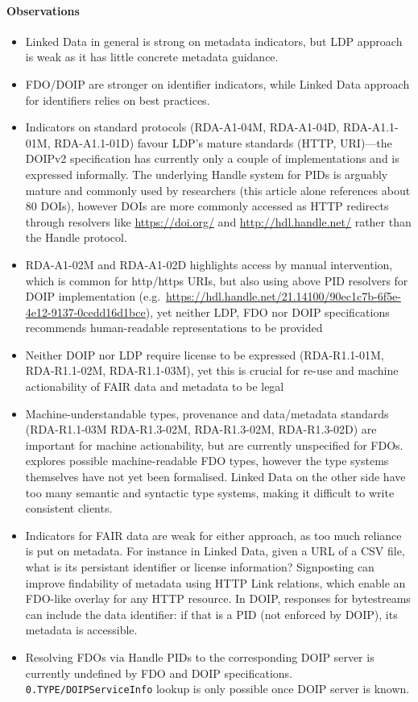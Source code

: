 \paragraph{Observations}

\begin{itemize}
\item
  Linked Data in general is strong on metadata indicators, but LDP approach is weak as it has little concrete metadata guidance.
\item
  FDO/DOIP are stronger on identifier indicators, while Linked Data approach for identifiers relies on best practices. 
\item
  Indicators on standard protocols (RDA-A1-04M, RDA-A1-04D, RDA-A1.1-01M, RDA-A1.1-01D) favour LDP's mature standards (HTTP, URI)---the DOIPv2 specification \cite{DONA 2018} has currently only a couple of implementations and is expressed informally. The underlying Handle system for PIDs is arguably mature and commonly used by researchers (this article alone references about 80 DOIs), however DOIs are more commonly accessed as HTTP redirects through resolvers like \url{https://doi.org/} and \url{http://hdl.handle.net/} rather than the Handle protocol.
\item
  RDA-A1-02M and RDA-A1-02D highlights access by manual intervention, which is common for http/https URIs, but also using above PID resolvers for DOIP implementation  (e.g.~\url{https://hdl.handle.net/21.14100/90ec1c7b-6f5e-4e12-9137-0cedd16d1bce}), yet neither LDP, FDO nor DOIP specifications recommends human-readable representations to be provided
\item
  Neither DOIP nor LDP require license to be expressed (RDA-R1.1-01M, RDA-R1.1-02M, RDA-R1.1-03M), yet this is crucial for re-use and machine actionability of FAIR data and metadata to be legal
\item
  Machine-understandable types, provenance and data/metadata standards (RDA-R1.1-03M RDA-R1.3-02M, RDA-R1.3-02M, RDA-R1.3-02D) are important for machine actionability, but are currently unspecified for FDOs. \cite{Blanchi 2023} explores possible machine-readable FDO types, however the type systems themselves have not yet been formalised. Linked Data on the other side have too many semantic and syntactic type systems, making it difficult to write consistent clients.
\item
  Indicators for FAIR data are weak for either approach, as too much reliance is put on metadata. For instance in Linked Data, given a URL of a CSV file, what is its persistant identifier or license information? Signposting \cite{Van de Sompel 2015} can improve findability of metadata using HTTP Link relations, which enable an FDO-like overlay for any HTTP resource. In DOIP, responses for bytestreams can include the data identifier: if that is a PID (not enforced by DOIP), its metadata is accessible.
\item
  Resolving FDOs via Handle PIDs to the corresponding DOIP server is currently undefined by FDO and DOIP specifications. \texttt{0.TYPE/DOIPServiceInfo} lookup is only possible once DOIP server is known.
\end{itemize}


